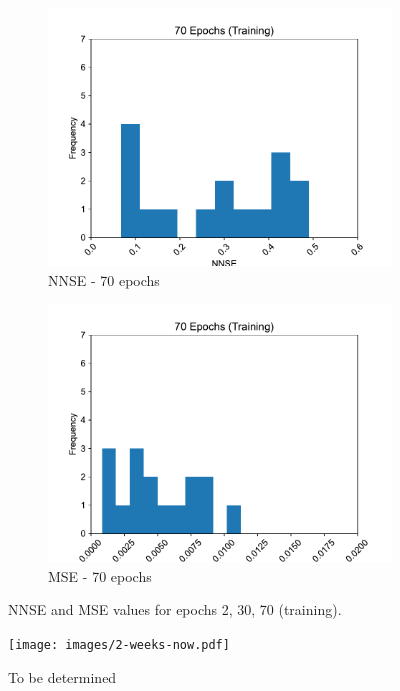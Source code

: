 \documentclass[11pt,twocolumn]{article}
\begin{document}
\begin{figure}[p]
\begin{subfigure}[b]{0.49\textwidth}
        \centering\includegraphics[width=1.0\linewidth]{images/70_training-NNSE.pdf}
        \caption{NNSE - 70 epochs}
        \label{fig:tbd3}
     \end{subfigure}
     \hfill
     \begin{subfigure}[b]{0.49\textwidth}
        \centering\includegraphics[width=1.0\linewidth]{images/70_training-MSE.pdf}
        \caption{MSE - 70 epochs}
        \label{fig:tbd4}
     \end{subfigure}
        \caption{NNSE and MSE values for epochs 2, 30, 70 (training).}
        \label{fig:six graphs}
\end{figure}

\begin{figure}[htb]
\centering\texttt{[image: images/2-weeks-now.pdf]}
\caption{To be determined}
\label{fig:tbd}
\end{figure}
\end{document}
